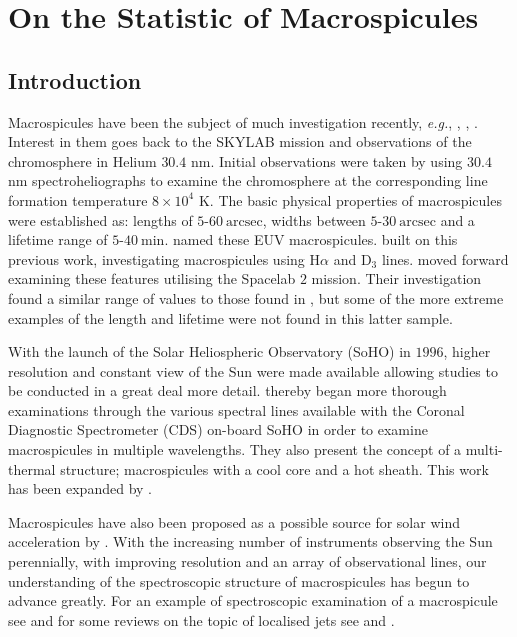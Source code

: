 
\chapter{On the Statistic of Macrospicules \label{ch:3}}  %

\section{Introduction}
Macrospicules have been the subject of much investigation recently, \emph{e.g.}, \cite{Sterling2010}, \cite{Madjarska2011}, \cite{Murawski2011}. Interest in them goes back to the SKYLAB mission and observations of the chromosphere in Helium $30.4$ nm. Initial observations were taken by \cite{Bohlin1975} using $30.4$ nm spectroheliographs to examine the chromosphere at the corresponding line formation temperature $8 \times 10^4$ K. The basic physical properties of macrospicules were established as: lengths of $5$-$60\ \textrm{arcsec}$, widths between $5$-$30\ \textrm{arcsec}$ and a lifetime range of $5$-$40\ \textrm{min}$. \cite{Bohlin1975} named these EUV macrospicules. \cite{LaBonte79} built on this previous work, investigating macrospicules using H$\alpha$ and D$_3$ lines. \cite{Dere89} moved forward examining these features utilising the Spacelab $2$ mission. Their investigation found a similar range of values to those found in \cite{Bohlin1975}, but some of the more extreme examples of the length and lifetime were not found in this latter sample.

With the launch of the Solar Heliospheric Observatory (SoHO) in $1996$, higher resolution and constant view of the Sun were made available allowing studies to be conducted in a great deal more detail. \cite{Pike_Harrison1997} thereby began more thorough examinations through the various spectral lines available with the Coronal Diagnostic Spectrometer (CDS) on-board SoHO in order to examine macrospicules in multiple wavelengths. They also present the concept of a multi-thermal structure; macrospicules with a cool core and a hot sheath. This work has been expanded by \cite{Parenti2002}. 

Macrospicules have also been proposed as a possible source for solar wind acceleration by \cite{Pike_Mason1998}. With the increasing number of instruments observing the Sun perennially, with improving resolution and an array of observational lines, our understanding of the spectroscopic structure of macrospicules has begun to advance greatly. For an example of spectroscopic examination of a macrospicule see \cite{Scullion2010} and for some reviews on the topic of localised jets see \cite{Sterling2000} and \cite{Zaqara_Erdelyi2009}.


